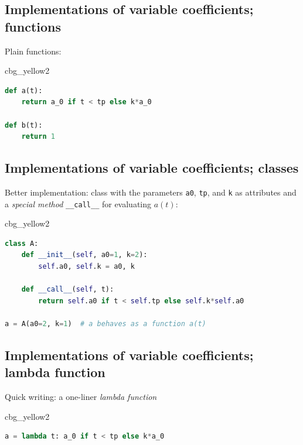 \documentclass[%
oneside,                 %
final,                   %
10pt]{article}
\newenvironment{_cod_tight}[1]{
   \def\FrameCommand{\colorbox{#1}}
   \FrameRule0.6pt\MakeFramed {\FrameRestore}\vskip3mm}
   {\vskip0mm\endMakeFramed}
\newenvironment{cod}[1]{
\bgroup\rmfamily
\fboxsep=0mm\relax
\begin{_cod_tight}{#1}
\list{}{\parsep=-2mm\parskip=0mm\topsep=0pt\leftmargin=2mm
\rightmargin=2\leftmargin\leftmargin=4pt\relax}
\item\relax}
{\endlist\end{_cod_tight}\egroup}
\begin{document}
\subsection*{Implementations of variable coefficients; functions}

Plain functions:

\begin{cod}{cbg_yellow2}\begin{lstlisting}[language=Python,style=simple,xleftmargin=2mm]
def a(t):
    return a_0 if t < tp else k*a_0

def b(t):
    return 1
\end{lstlisting}\end{cod}
\noindent

\subsection*{Implementations of variable coefficients; classes}

Better implementation: class with the parameters \texttt{a0}, \texttt{tp}, and \texttt{k}
as attributes and a \emph{special method} \Verb!__call__! for evaluating $a(t)$:

\begin{cod}{cbg_yellow2}\begin{lstlisting}[language=Python,style=simple,xleftmargin=2mm]
class A:
    def __init__(self, a0=1, k=2):
        self.a0, self.k = a0, k

    def __call__(self, t):
        return self.a0 if t < self.tp else self.k*self.a0

a = A(a0=2, k=1)  # a behaves as a function a(t)
\end{lstlisting}\end{cod}
\noindent

\subsection*{Implementations of variable coefficients; lambda function}


Quick writing: a one-liner \emph{lambda function}
\begin{cod}{cbg_yellow2}\begin{lstlisting}[language=Python,style=simple,xleftmargin=2mm]
a = lambda t: a_0 if t < tp else k*a_0
\end{lstlisting}\end{cod}
\noindent
\end{document}
